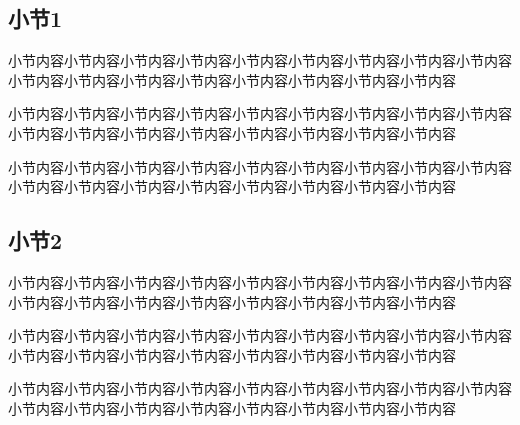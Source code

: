 \documentclass[a4paper, 12pt, oneside]{article}
\theoremstyle{cn_theorem}
\begin{document}
\subsection{小节1}
小节内容小节内容小节内容小节内容小节内容小节内容小节内容小节内容小节内容小节内容小节内容小节内容小节内容小节内容小节内容小节内容小节内容

小节内容小节内容小节内容小节内容小节内容小节内容小节内容小节内容小节内容小节内容小节内容小节内容小节内容小节内容小节内容小节内容小节内容

小节内容小节内容小节内容小节内容小节内容小节内容小节内容小节内容小节内容小节内容小节内容小节内容小节内容小节内容小节内容小节内容小节内容

\subsection{小节2}
小节内容小节内容小节内容小节内容小节内容小节内容小节内容小节内容小节内容小节内容小节内容小节内容小节内容小节内容小节内容小节内容小节内容

小节内容小节内容小节内容小节内容小节内容小节内容小节内容小节内容小节内容小节内容小节内容小节内容小节内容小节内容小节内容小节内容小节内容

小节内容小节内容小节内容小节内容小节内容小节内容小节内容小节内容小节内容小节内容小节内容小节内容小节内容小节内容小节内容小节内容小节内容
\end{document}
